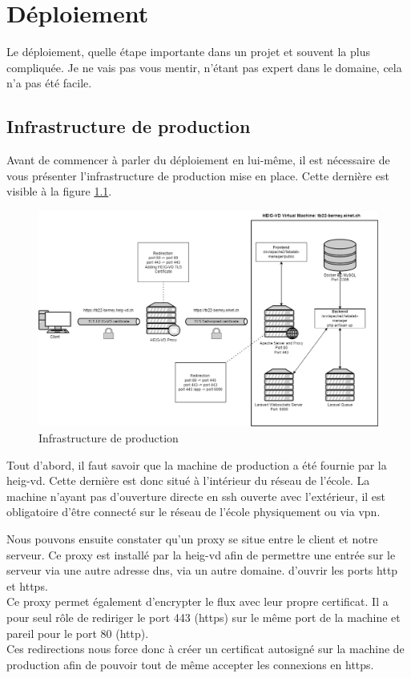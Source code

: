 \documentclass[
    iai, %
    il, %
]{heig-tb}
\begin{document}
\chapter{Déploiement}
Le déploiement, quelle étape importante dans un projet et souvent la plus compliquée.
Je ne vais pas vous mentir, n'étant pas expert dans le domaine, cela n'a pas été facile.

\section{Infrastructure de production}
Avant de commencer à parler du déploiement en lui-même, il est nécessaire de vous présenter l'infrastructure de production mise en place. Cette dernière est visible à la figure \ref{prod-infra}.

\begin{center}
    \begin{figure}[H]
        \includegraphics[width=\textwidth]{./assets/figures/prod-infra.png}
        \caption{Infrastructure de production \label{prod-infra}}
    \end{figure}
\end{center}

Tout d'abord, il faut savoir que la machine de production a été fournie par la \Gls{heig-vd}. Cette dernière est donc situé à l'intérieur du réseau de l'école. La machine n'ayant pas d'ouverture directe en \Gls{ssh} ouverte avec l'extérieur, il est obligatoire d'être connecté sur le réseau de l'école physiquement ou via \Gls{vpn}.

Nous pouvons ensuite constater qu'un \Gls{proxy} se situe entre le client et notre serveur. Ce \Gls{proxy} est installé par la \Gls{heig-vd} afin de permettre une entrée sur le serveur via une autre adresse \Gls{dns}, via un autre domaine. d'ouvrir les ports \Gls{http} et \Gls{https}. \\
Ce \Gls{proxy} permet également d'encrypter le flux avec leur propre certificat. Il a pour seul rôle de rediriger le port 443 (\Gls{https}) sur le même port de la machine et pareil pour le port 80 (\Gls{http}). \\
Ces redirections nous force donc à créer un certificat autosigné sur la machine de production afin de pouvoir tout de même accepter les connexions en \Gls{https}.
\end{document}
